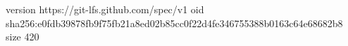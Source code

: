 version https://git-lfs.github.com/spec/v1
oid sha256:e0fdb39878fb9f75fb21a8ed02b85cc0f22d4fe346755388b0163c64e68682b8
size 420
